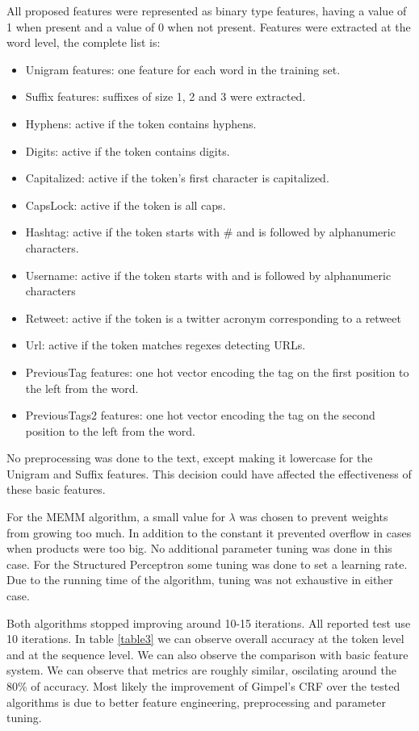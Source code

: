 \documentclass[11pt]{article}
\begin{document}
All proposed features were represented as binary type features, having a value of 1 when present and a value of 0 when not present. Features were extracted at the word level, the complete list is:

\begin{itemize}
\item Unigram features: one feature for each word in the training set.
\item Suffix features: suffixes of size 1, 2 and 3 were extracted. 
\item Hyphens: active if the token contains hyphens.
\item Digits: active if the token contains digits.
\item Capitalized: active if the token's first character is capitalized.
\item CapsLock: active if the token is all caps.
\item Hashtag: active if the token starts with \# and is followed by alphanumeric characters.
\item Username: active if the token starts with \@ and is followed by alphanumeric characters
\item Retweet: active if the token is a twitter acronym corresponding to a retweet
\item Url: active if the token matches regexes detecting URLs. 
\item PreviousTag features: one hot vector encoding the tag on the first position to the left from the word.
\item PreviousTags2 features: one hot vector encoding the tag on the second position to the left from the word.

\end{itemize}

No preprocessing was done to the text, except making it lowercase for the Unigram and Suffix features. This decision could have affected the effectiveness of these basic features.

For the MEMM algorithm, a small value for $\lambda$ was chosen to prevent weights from growing too much. In addition to the constant it prevented overflow in cases when products were too big. No additional parameter tuning was done in this case. For the Structured Perceptron some tuning was done to set a learning rate. Due to the running time of the algorithm, tuning was not exhaustive in either case.

Both algorithms stopped improving around 10-15 iterations. All reported test use 10 iterations. In table \ref{table3} we can observe overall accuracy at the token level and at the sequence level. We can also observe the comparison with \cite{Gimpel:2011:PTT:2002736.2002747} basic feature system. We can observe that metrics are roughly similar, oscilating around the 80\% of accuracy. Most likely the improvement of Gimpel's CRF over the tested algorithms is due to better feature engineering, preprocessing and parameter tuning. 
\end{document}
